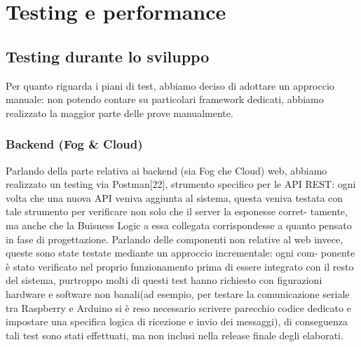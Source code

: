 \section{Testing e performance}





\subsection{Testing durante lo sviluppo}

Per quanto riguarda i piani di test, abbiamo deciso di adottare un approccio manuale:
non potendo contare su particolari framework dedicati, abbiamo realizzato la maggior parte delle prove manualmente.

\subsubsection[Backend]{Backend (Fog \& Cloud)}

Parlando della parte relativa ai backend (sia Fog che Cloud)
web, abbiamo realizzato un testing via Postman[22], strumento specifico per le
API REST: ogni volta che una nuova API veniva aggiunta al sistema, questa veniva
testata con tale strumento per verificare non solo che il server la esponesse corret-
tamente, ma anche che la Buisness Logic a essa collegata corrispondesse a quanto
pensato in fase di progettazione. Parlando delle componenti non relative al web
invece, queste sono state testate mediante un approccio incrementale: ogni com-
ponente è stato verificato nel proprio funzionamento prima di essere integrato con
il resto del sistema, purtroppo molti di questi test hanno richiesto con figurazioni
hardware e software non banali(ad esempio, per testare la comunicazione seriale
tra Raspberry e Arduino si è reso necessario scrivere parecchio codice dedicato e
impostare una specifica logica di ricezione e invio dei messaggi), di conseguenza
tali test sono stati effettuati, ma non inclusi nella release finale degli elaborati.

